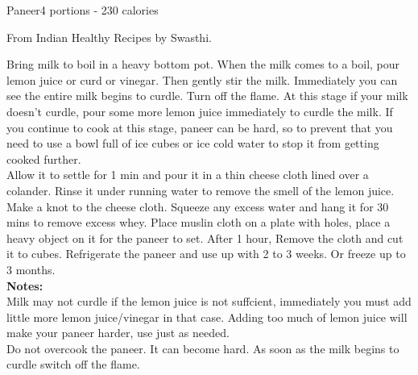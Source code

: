 \begin{recipe}{Paneer}{4 portions - 230 calories}{}

\freeform From Indian Healthy Recipes by Swasthi.


Bring milk to boil in a heavy bottom pot. When the milk comes to a boil, pour lemon juice or curd or vinegar. Then gently stir the milk. Immediately you can see the entire milk begins to curdle. Turn off the flame. At this stage if your milk doesn't curdle, pour some more lemon juice immediately to curdle the milk. If you continue to cook at this stage, paneer can be hard, so to prevent that you need to use a bowl full of ice cubes or ice cold water to stop it from getting cooked further.\\

Allow it to settle for 1 min and pour it in a thin cheese cloth lined over a colander. Rinse it under running water to remove the smell of the lemon juice.\\

Make a knot to the cheese cloth. Squeeze any excess water and hang it for 30 mins to remove excess whey. Place muslin cloth on a plate with holes, place a heavy object on it for the paneer to set. After 1 hour, Remove the cloth and cut it to cubes. Refrigerate the paneer and use up with 2 to 3 weeks. Or freeze up to 3 months.\\

\textbf{Notes:}\\

Milk may not curdle if the lemon juice is not suffcient, immediately you must add little more lemon juice/vinegar in that case. Adding too much of lemon juice will make your paneer harder, use just as needed.\\

Do not overcook the paneer. It can become hard. As soon as the milk begins to curdle switch off the flame.

\end{recipe}